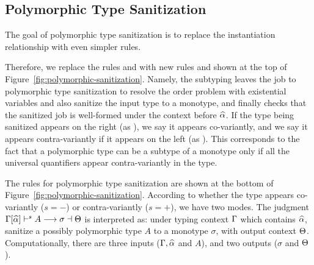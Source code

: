 \subsection{Polymorphic Type Sanitization}

\begin{figure*}[t]

  \caption{New subtyping rules, polymorphic type sanitization.}
  \label{fig:polymorphic-sanitization}
\end{figure*}

The goal of polymorphic type sanitization is to replace the instantiation
relationship with even simpler rules.

Therefore, we replace the rules  and  with new rules
 and  shown at the top of
Figure~\ref{fig:polymorphic-sanitization}. Namely, the subtyping leaves the job
to polymorphic type sanitization to resolve the order problem with existential
variables and also sanitize the input type to a monotype, and finally checks
that the sanitized job is well-formed under the context before $\widehat{\alpha}$.
If the type being sanitized appears on the right (as ), we say it
appears co-variantly, and we say it appears contra-variantly if it appears on
the left (as ). This corresponds to the fact that a polymorphic type
can be a subtype of a monotype only if all the universal quantifiers appear
contra-variantly in the type.

The rules for polymorphic type sanitization are shown at the bottom of
Figure~\ref{fig:polymorphic-sanitization}. According to whether the type appears
co-variantly ($s = -$) or contra-variantly ($s = +$), we have two modes. The
judgment $\Gamma[\widehat{\alpha}] \vdash^{s} A \longrightarrow \sigma \dashv \Theta$ is interpreted as: under
typing context $\Gamma$ which contains $\widehat{\alpha}$, sanitize a possibly polymorphic
type $A$ to a monotype
$\sigma$, with output context $\Theta$. Computationally, there are three inputs
($\Gamma, \widehat{\alpha}$ and $A$), and two outputs ($\sigma$ and $\Theta$).

